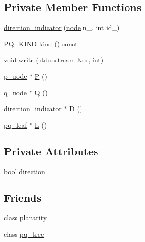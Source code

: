 \subsection*{Private Member Functions}
\begin{DoxyCompactItemize}
\item 
\mbox{\hyperlink{classdirection__indicator_a9b5f07e3052704b46790c26205c03583}{direction\+\_\+indicator}} (\mbox{\hyperlink{classnode}{node}} n\+\_\+, int id\+\_\+)
\item 
\mbox{\hyperlink{classpq__node_a96827bdca8bf81d20213405dd27f8fa6}{P\+Q\+\_\+\+K\+I\+ND}} \mbox{\hyperlink{classdirection__indicator_ab0ffeb761ec0d157b4c6ba13ece96d9b}{kind}} () const
\item 
void \mbox{\hyperlink{classdirection__indicator_a9da5371a5ca8678a10069400cc4ca580}{write}} (std\+::ostream \&os, int)
\item 
\mbox{\hyperlink{classp__node}{p\+\_\+node}} $\ast$ \mbox{\hyperlink{classdirection__indicator_a505a48437200ab98e8165912fd1d40bf}{P}} ()
\item 
\mbox{\hyperlink{classq__node}{q\+\_\+node}} $\ast$ \mbox{\hyperlink{classdirection__indicator_ace3187cd86da88e949045c6a57ea6a00}{Q}} ()
\item 
\mbox{\hyperlink{classdirection__indicator}{direction\+\_\+indicator}} $\ast$ \mbox{\hyperlink{classdirection__indicator_aef2ff42f0a64c7d10fbf42059c008f38}{D}} ()
\item 
\mbox{\hyperlink{classpq__leaf}{pq\+\_\+leaf}} $\ast$ \mbox{\hyperlink{classdirection__indicator_ad05d1484cc0ac57669dfd308ae1fbaa4}{L}} ()
\end{DoxyCompactItemize}
\subsection*{Private Attributes}
\begin{DoxyCompactItemize}
\item 
bool \mbox{\hyperlink{classdirection__indicator_a16b023545435b012abc433a0b43dc35f}{direction}}
\end{DoxyCompactItemize}
\subsection*{Friends}
\begin{DoxyCompactItemize}
\item 
class \mbox{\hyperlink{classdirection__indicator_ab6a02224dbc06343d95919289aec77c8}{planarity}}
\item 
class \mbox{\hyperlink{classdirection__indicator_a0a5be4bb438c891059fae98f607f2a9c}{pq\+\_\+tree}}
\end{DoxyCompactItemize}


